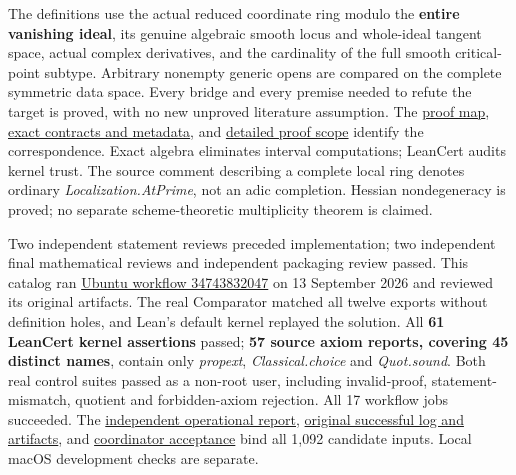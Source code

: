\documentclass[11pt,a4paper]{article}
\begin{document}
The definitions use the actual reduced coordinate ring modulo the
\textbf{entire vanishing ideal}, its genuine algebraic smooth locus and
whole-ideal tangent space, actual complex derivatives, and the
cardinality of the full smooth critical-point subtype. Arbitrary
nonempty generic opens are compared on the complete symmetric data
space. Every bridge and every premise needed to refute the target is
proved, with no new unproved literature assumption. The
\href{https://github.com/ajt60gaibb/OpenProblemsInNLA/blob/main/randomized-and-low-rank-approximation/RA-20/lean/PROOF_MAP.md}{proof
map},
\href{https://github.com/ajt60gaibb/OpenProblemsInNLA/blob/main/randomized-and-low-rank-approximation/RA-20/lean/formalization.yaml}{exact
contracts and metadata}, and
\href{https://github.com/ajt60gaibb/OpenProblemsInNLA/blob/main/randomized-and-low-rank-approximation/RA-20/lean/README.md}{detailed
proof scope} identify the correspondence. Exact algebra eliminates
interval computations; LeanCert audits kernel trust. The source comment
describing a complete local ring denotes ordinary
\textit{Localization.AtPrime}, not an adic completion. Hessian
nondegeneracy is proved; no separate scheme-theoretic multiplicity
theorem is claimed.

Two independent statement reviews preceded implementation; two
independent final mathematical reviews and independent packaging review
passed. This catalog ran
\href{https://github.com/sgstepaniants/OpenProblemsInNLA/actions/runs/34743832047}{Ubuntu
workflow 34743832047} on 13 September 2026 and reviewed its original
artifacts. The real Comparator matched all twelve exports without
definition holes, and Lean's default kernel replayed the solution. All
\textbf{61 LeanCert kernel assertions} passed; \textbf{57 source axiom
reports, covering 45 distinct names}, contain only \textit{propext},
\textit{Classical.choice} and \textit{Quot.sound}. Both real control
suites passed as a non-root user, including invalid-proof,
statement-mismatch, quotient and forbidden-axiom rejection. All 17
workflow jobs succeeded. The
\href{https://github.com/ajt60gaibb/OpenProblemsInNLA/blob/main/randomized-and-low-rank-approximation/RA-20/lean/reviews/linux-operational-referee-2026-09-13.md}{independent
operational report},
\href{https://github.com/ajt60gaibb/OpenProblemsInNLA/blob/main/randomized-and-low-rank-approximation/RA-20/lean/verification/linux-run-2026-09-13/runtime-verification.json}{original
successful log and artifacts}, and
\href{https://github.com/ajt60gaibb/OpenProblemsInNLA/blob/main/randomized-and-low-rank-approximation/RA-20/lean/verification/root-linux-acceptance-2026-09-13/ROOT-ACCEPTANCE.json}{coordinator
acceptance} bind all 1,092 candidate inputs. Local macOS development
checks are separate.
\end{document}
